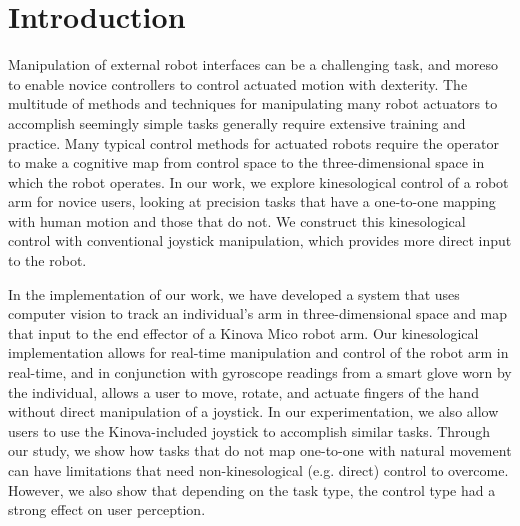 \documentclass{sigchi}
\begin{document}


\section{Introduction}

Manipulation of external robot interfaces can be a challenging task, and moreso to enable novice controllers to control actuated motion with dexterity.  The multitude of methods and techniques for manipulating many robot actuators to accomplish seemingly simple tasks generally require extensive training and practice.  Many typical control methods for actuated robots require the operator to make a cognitive map from control space to the three-dimensional space in which the robot operates.  In our work, we explore kinesological control of a robot arm for novice users, looking at precision tasks that have a one-to-one mapping with human motion and those that do not.  We construct this kinesological control with conventional joystick manipulation, which provides more direct input to the robot.  

In the implementation of our work, we have developed a system that uses computer vision to track an individual's arm in three-dimensional space and map that input to the end effector of a Kinova Mico robot arm.  Our kinesological implementation allows for real-time manipulation and control of the robot arm in real-time, and in conjunction with gyroscope readings from a smart glove worn by the individual, allows a user to move, rotate, and actuate fingers of the hand without direct manipulation of a joystick. In our experimentation, we also allow users to use the Kinova-included joystick to accomplish similar tasks. Through our study, we show how tasks that do not map one-to-one with natural movement can have limitations that need non-kinesological (e.g. direct) control to overcome.  However, we also show that depending on the task type, the control type had a strong effect on user perception.
\end{document}
